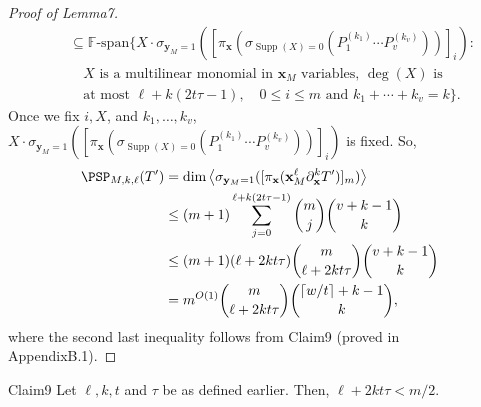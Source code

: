 \begin{proof}[Proof of Lemma7]
\begin{align*}
&\quad\subseteq\mathbb F\text{-span}\{X\cdot\sigma_{\mathbf y_M=1}([\pi_{\mathbf x}(\sigma_{\operatorname{Supp}(X)=0}(P_1^{(k_1)}\cdots P_v^{(k_v)}))]_i):\\
&\qquad X\text{ is a multilinear monomial in }\mathbf x_M\text{ variables, }\deg(X)\text{ is}\\
&\qquad\text{at most }\ell+k(2t\tau-1),\quad0\le i\le m\text{ and }k_1+\cdots+k_v=k\}.
\end{align*}
Once we fix $i,X$, and $k_1,\ldots,k_v$, $X\cdot\sigma_{\mathbf y_M=1}([\pi_{\mathbf x}(\sigma_{\operatorname{Supp}(X)=0}(P_1^{(k_1)}\cdots P_v^{(k_v)}))]_i)$ is fixed. So,
\begin{align*}
\PSP_{M,k,\ell}(T')
&=\dim\left\langle\sigma_{\mathbf y_M=1}([\pi_{\mathbf x}(\mathbf x_M^\ell\partial_{\mathbf x}^kT')]_m)\right\rangle\\
&\le(m+1)\sum_{j=0}^{\ell+k(2t\tau-1)}\binom mj\binom{v+k-1}k\\
&\le(m+1)(\ell+2kt\tau)\binom m{\ell+2kt\tau}\binom{v+k-1}k\\
&=m^{O(1)}\binom m{\ell+2kt\tau}\binom{\lceil w/t\rceil+k-1}k,
\end{align*}
where the second last inequality follows from Claim9 (proved in AppendixB.1).
\end{proof}
\begin{authorclaim}{Claim9}
Let $\ell,k,t$ and $\tau$ be as defined earlier. Then, $\ell+2kt\tau<m/2$.
\end{authorclaim}
